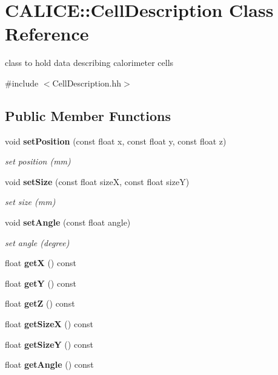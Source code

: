 \section{C\-A\-L\-I\-C\-E\-:\-:Cell\-Description Class Reference}
\label{classCALICE_1_1CellDescription}


class to hold data describing calorimeter cells  




{\ttfamily \#include $<$Cell\-Description.\-hh$>$}

\subsection*{Public Member Functions}
\begin{DoxyCompactItemize}
\item 
void {\bf set\-Position} (const float x, const float y, const float z)
\begin{DoxyCompactList}\small\item\em set position (mm) \end{DoxyCompactList}\item 
void {\bf set\-Size} (const float size\-X, const float size\-Y)
\begin{DoxyCompactList}\small\item\em set size (mm) \end{DoxyCompactList}\item 
void {\bf set\-Angle} (const float angle)
\begin{DoxyCompactList}\small\item\em set angle (degree) \end{DoxyCompactList}\item 
float {\bf get\-X} () const 
\item 
float {\bf get\-Y} () const 
\item 
float {\bf get\-Z} () const 
\item 
float {\bf get\-Size\-X} () const 
\item 
float {\bf get\-Size\-Y} () const 
\item 
float {\bf get\-Angle} () const 
\end{DoxyCompactItemize}
